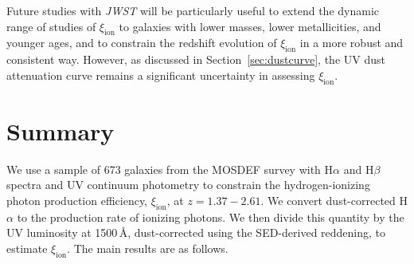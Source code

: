 \documentclass[iop]{emulateapj}
\newcommand{\xiion}{\ensuremath{\xi_{\mathrm{ion}}}}
\newcommand{\halpha}{H\ensuremath{\alpha}}
\newcommand{\hbeta}{H\ensuremath{\beta}}
\begin{document}
Future studies with {\em JWST} will be particularly useful to extend the dynamic range of studies of {\xiion} to galaxies with lower masses, lower metallicities, and younger ages, and to constrain the redshift evolution of {\xiion} in a more robust and consistent way. However, as discussed in Section~\ref{sec:dustcurve}, the UV dust attenuation curve remains a significant uncertainty in assessing {\xiion}.

\section{Summary}
\label{sec:summary}

We use a sample of 673 galaxies from the MOSDEF survey with {\halpha} and {\hbeta} spectra and UV continuum photometry to constrain the hydrogen-ionizing photon production efficiency, {\xiion}, at $z= 1.37-2.61$. 
We convert dust-corrected {\halpha} to the production rate of ionizing photons. We then divide this quantity by the UV luminosity at 1500\,\AA, dust-corrected using the SED-derived reddening, to estimate {\xiion}.
The main results are as follows.
\end{document}
